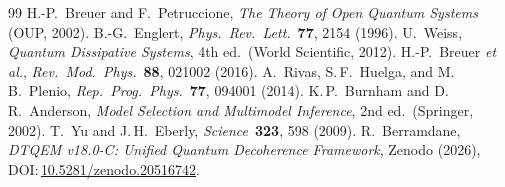 \documentclass[reprint,amsmath,amssymb,aps,pra,superscriptaddress]{revtex4-2}
\begin{document}
\begin{thebibliography}{99}
  H.-P.~Breuer and F.~Petruccione,
  \emph{The Theory of Open Quantum Systems} (OUP, 2002).
  B.-G.~Englert, \emph{Phys.\ Rev.\ Lett.}\ \textbf{77}, 2154 (1996).
  U.~Weiss, \emph{Quantum Dissipative Systems}, 4th ed.\ (World Scientific, 2012).
  H.-P.~Breuer \emph{et al.},
  \emph{Rev.\ Mod.\ Phys.}\ \textbf{88}, 021002 (2016).
  A.~Rivas, S.\,F.~Huelga, and M.\,B.~Plenio,
  \emph{Rep.\ Prog.\ Phys.}\ \textbf{77}, 094001 (2014).
  K.\,P.~Burnham and D.\,R.~Anderson,
  \emph{Model Selection and Multimodel Inference}, 2nd ed.\ (Springer, 2002).
  T.~Yu and J.\,H.~Eberly, \emph{Science}\ \textbf{323}, 598 (2009).
  R.~Berramdane,
  \emph{DTQEM v18.0-C: Unified Quantum Decoherence Framework},
  Zenodo (2026),
  DOI:\,\href{https://doi.org/10.5281/zenodo.20516742}{10.5281/zenodo.20516742}.
\end{thebibliography}
\end{document}

